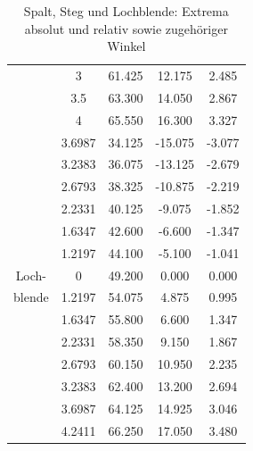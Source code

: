\documentclass[12pt,a4paper,titlepage,headinclude,bibtotoc]{scrartcl}
\begin{document}
\begin{table}[!htb]
\begin{tabular}{|c||c|c|c|c|}
		&	3	&	61.425	&	12.175	&	2.485	\\
		&	3.5	&	63.300	&	14.050	&	2.867	\\
		&	4	&	65.550	&	16.300	&	3.327	\\
		\hline
		&	3.6987	&	34.125	&	-15.075	&	-3.077	\\
		&	3.2383	&	36.075	&	-13.125	&	-2.679	\\
		&	2.6793	&	38.325	&	-10.875	&	-2.219	\\
		&	2.2331	&	40.125	&	-9.075	&	-1.852	\\
		&	1.6347	&	42.600	&	-6.600	&	-1.347	\\
		&	1.2197	&	44.100	&	-5.100	&	-1.041	\\
		Loch- &	0	&	49.200	&	0.000	&	0.000	\\
		blende &	1.2197	&	54.075	&	4.875	&	0.995	\\
		&	1.6347	&	55.800	&	6.600	&	1.347	\\
		&	2.2331	&	58.350	&	9.150	&	1.867	\\
		&	2.6793	&	60.150	&	10.950	&	2.235	\\
		&	3.2383	&	62.400	&	13.200	&	2.694	\\
		&	3.6987	&	64.125	&	14.925	&	3.046	\\
		&	4.2411	&	66.250	&	17.050	&	3.480	\\
		\hline
	\end{tabular}
	\caption{Spalt, Steg und Lochblende: Extrema absolut und relativ sowie zugehöriger Winkel}
	\label{tab:extrema1}
\end{table}
\end{document}
